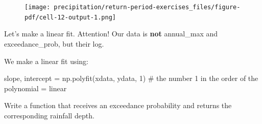 \documentclass[
  letterpaper,
  DIV=11,
  numbers=noendperiod]{scrreprt}
\newenvironment{Shaded}{\begin{snugshade}}{\end{snugshade}}
\newcommand{\CommentTok}[1]{\textcolor[rgb]{0.37,0.37,0.37}{#1}}
\newcommand{\DecValTok}[1]{\textcolor[rgb]{0.68,0.00,0.00}{#1}}
\newcommand{\NormalTok}[1]{\textcolor[rgb]{0.00,0.23,0.31}{#1}}
\newcommand{\OperatorTok}[1]{\textcolor[rgb]{0.37,0.37,0.37}{#1}}
\begin{document}
\begin{figure}[H]

{\centering \texttt{[image: precipitation/return-period-exercises\_files/figure-pdf/cell-12-output-1.png]}

}

\end{figure}

Let's make a linear fit. Attention! Our data is \textbf{not} annual\_max
and exceedance\_prob, but their log.

We make a linear fit using:

\begin{Shaded}
\begin{Highlighting}[]
\NormalTok{slope, intercept }\OperatorTok{=}\NormalTok{ np.polyfit(xdata, ydata, }\DecValTok{1}\NormalTok{) }\CommentTok{\# the number 1 in the order of the polynomial = linear}
\end{Highlighting}
\end{Shaded}

Write a function that receives an exceedance probability and returns the
corresponding rainfall depth.
\end{document}

